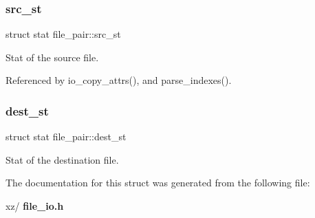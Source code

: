 \subsubsection{src\+\_\+st}
{\footnotesize\ttfamily struct stat file\+\_\+pair\+::src\+\_\+st}



Stat of the source file. 



Referenced by io\+\_\+copy\+\_\+attrs(), and parse\+\_\+indexes().

\mbox{\label{structfile__pair_a31c3f2a5ea5d9538c4e29398c535a183}} 
\subsubsection{dest\+\_\+st}
{\footnotesize\ttfamily struct stat file\+\_\+pair\+::dest\+\_\+st}



Stat of the destination file. 



The documentation for this struct was generated from the following file\+:\begin{DoxyCompactItemize}
\item 
xz/\textbf{ file\+\_\+io.\+h}\end{DoxyCompactItemize}
